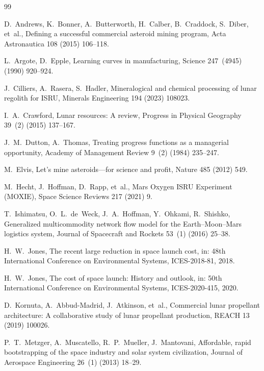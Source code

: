 \documentclass[preprint,12pt]{elsarticle}
\begin{document}
\begin{thebibliography}{99}

D.~Andrews, K.~Bonner, A.~Butterworth, H.~Calber, B.~Craddock, S.~Diber, et~al.,
\newblock Defining a successful commercial asteroid mining program,
\newblock Acta Astronautica 108 (2015) 106--118.

L.~Argote, D.~Epple,
\newblock Learning curves in manufacturing,
\newblock Science 247~(4945) (1990) 920--924.

J.~Cilliers, A.~Rasera, S.~Hadler,
\newblock Mineralogical and chemical processing of lunar regolith for ISRU,
\newblock Minerals Engineering 194 (2023) 108023.

I.~A.~Crawford,
\newblock Lunar resources: A review,
\newblock Progress in Physical Geography 39~(2) (2015) 137--167.

J.~M.~Dutton, A.~Thomas,
\newblock Treating progress functions as a managerial opportunity,
\newblock Academy of Management Review 9~(2) (1984) 235--247.

M.~Elvis,
\newblock Let's mine asteroids---for science and profit,
\newblock Nature 485 (2012) 549.

M.~Hecht, J.~Hoffman, D.~Rapp, et~al.,
\newblock Mars Oxygen ISRU Experiment (MOXIE),
\newblock Space Science Reviews 217 (2021) 9.

T.~Ishimatsu, O.~L.~de~Weck, J.~A.~Hoffman, Y.~Ohkami, R.~Shishko,
\newblock Generalized multicommodity network flow model for the Earth--Moon--Mars logistics system,
\newblock Journal of Spacecraft and Rockets 53~(1) (2016) 25--38.

H.~W.~Jones,
\newblock The recent large reduction in space launch cost,
\newblock in: 48th International Conference on Environmental Systems, ICES-2018-81, 2018.

H.~W.~Jones,
\newblock The cost of space launch: History and outlook,
\newblock in: 50th International Conference on Environmental Systems, ICES-2020-415, 2020.

D.~Kornuta, A.~Abbud-Madrid, J.~Atkinson, et~al.,
\newblock Commercial lunar propellant architecture: A collaborative study of lunar propellant production,
\newblock REACH 13 (2019) 100026.

P.~T.~Metzger, A.~Muscatello, R.~P.~Mueller, J.~Mantovani,
\newblock Affordable, rapid bootstrapping of the space industry and solar system civilization,
\newblock Journal of Aerospace Engineering 26~(1) (2013) 18--29.


\end{thebibliography}
\end{document}
